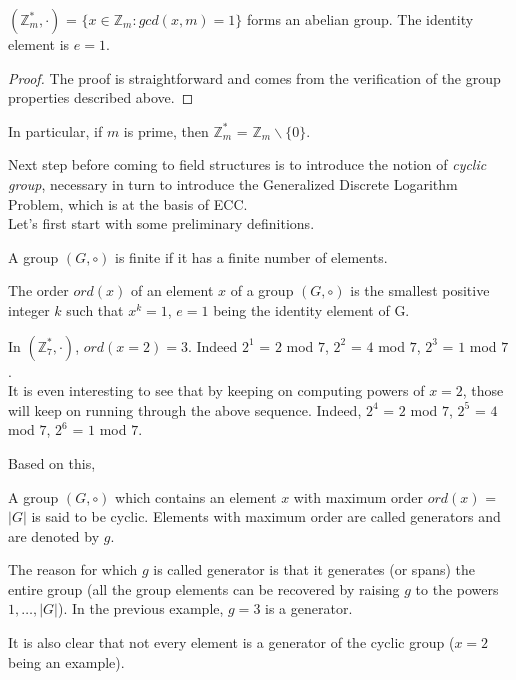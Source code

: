 \begin{myprop}
    $(\mathbb{Z}_m^{*},\cdot)$ = $\{x \in \mathbb{Z}_m: gcd(x,m)=1\}$ forms an abelian group. The identity element is $e=1$.
\end{myprop}
\begin{proof}
    The proof is straightforward and comes from the verification of the group properties described above.
\end{proof}
\begin{myrem}
    In particular, if $m$ is prime, then $\mathbb{Z}_m^{*}$ = $\mathbb{Z}_m \backslash \{0\}$.
\end{myrem}
\noindent 
Next step before coming to field structures is to introduce the notion of \textit{cyclic group}, necessary in turn to introduce the Generalized Discrete Logarithm Problem, which is at the basis of ECC.\\
Let's first start with some preliminary definitions.
\begin{mydef}
    A group $(G,\circ)$ is finite if it has a finite number of elements. 
\end{mydef}
\begin{mydef}
    The order $ord(x)$ of an element $x$ of a group $(G,\circ)$ is the smallest positive integer $k$ such that $x^k=1$, $e=1$ being the identity element of G.
\end{mydef}
\begin{myexample}
    In $(\mathbb{Z}_7^{*},\cdot)$, $ord(x=2)=3$. Indeed $2^1$ = $2$ mod $7$, $2^2$ = $4$ mod $7$, $2^3$ = $1$ mod $7$.\\
    It is even interesting to see that by keeping on computing powers of $x=2$, those will keep on running through the above sequence. Indeed, $2^4$ = $2$ mod $7$, $2^5$ = $4$ mod $7$, $2^6$ = $1$ mod $7$.
\end{myexample}
\noindent
Based on this, 
\begin{mydef}
    A group $(G,\circ)$ which contains an element $x$ with maximum order $ord(x)$ = $|G|$ is said to be cyclic. Elements with maximum order are called generators and are denoted by $g$.
\end{mydef}
\begin{myrem}
    The reason for which $g$ is called generator is that it generates (or spans) the entire group (all the group elements can be recovered by raising $g$ to the powers $1,\dots,|G|$). In the previous example, $g=3$ is a generator.
\end{myrem}
\begin{myrem}
    It is also clear that not every element is a generator of the cyclic group ($x=2$ being an example).
\end{myrem}
